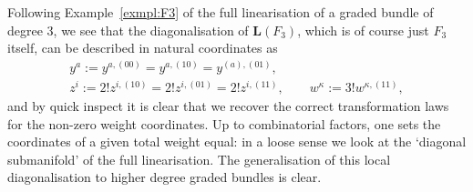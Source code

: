 \documentclass[11pt]{article}
\def\Linr{{\mathbf{L}}} %
\numberwithin{equation}{section}
\begin{document}
\begin{Example}
Following Example~\ref{exmpl:F3} of the full linearisation of a graded bundle of degree $3$, we see that the diagonalisation of $\Linr(F_{3})$, which is of course just $F_{3}$ itself, can be described in natural coordinates as
\begin{gather*}
 y^{a} := y^{a,(00)} = y^{a,(10)} = y^{(a),(01)}, \\ z^{i} := 2! z^{i,(10)}= 2! z^{i,(01)}= 2! z^{i,(11)}, \qquad w^{\kappa} := 3! w^{\kappa,(11)},
\end{gather*}
and by quick inspect it is clear that we recover the correct transformation laws for the non-zero weight coordinates. Up to combinatorial factors, one sets the coordinates of a given total weight equal: in a loose sense we look at the `diagonal submanifold' of the full linearisation. The generalisation of this local diagonalisation to higher degree graded bundles is clear.
\end{Example}
\end{document}
